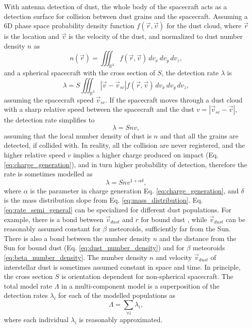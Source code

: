 With antenna detection of dust, the whole body of the spacecraft acts as a detection surface for collision between dust grains and the spacecraft. Assuming a 6D phase space probability density function $f(\vec{r},\vec{v})$ for the dust cloud, where $\vec{r}$ is the location and $\vec{v}$ is the velocity of the dust, and normalized to dust number density $n$ as
\begin{equation}
    n(\vec{r}) = \iiint_{\mathbb{R}^3} f(\vec{r},\vec{v}) \,dv_x\,dv_y\,dv_z,
\end{equation}
and a spherical spacecraft with the cross section of $S$, the detection rate $\lambda$ is
\begin{equation}
    \lambda = S \iiint_{\mathbb{R}^3} |\vec{v}-\vec{v}_{sc}| f(\vec{r},\vec{v})  \,dv_x\,dv_y\,dv_z, \label{eq:phase_space_lambda}
\end{equation}
assuming the spacecraft speed $\vec{v}_{sc}$. If the spacecraft moves through a dust cloud with a sharp relative speed between the spacecraft and the dust $v=|\vec{v}_{sc}-\vec{v}|$, the detection rate simplifies to  
\begin{equation}
    \lambda = S n v,
\end{equation}
assuming that the local number density of dust is $n$ and that all the grains are detected, if collided with. In reality, all the collision are never registered, and the higher relative speed $v$ implies a higher charge produced on impact (Eq. \ref{eq:charge_generation}), and in turn higher probability of detection, therefore the rate is sometimes modelled as
\begin{equation}
    \lambda = S n v^{1+\alpha \delta}, \label{eq:rate_semi_general}
\end{equation}
where $\alpha$ is the parameter in charge generation Eq. \ref{eq:charge_generation}, and $\delta$ is the mass distribution slope from Eq. \ref{eq:mass_distribution}. Eq. \ref{eq:rate_semi_general} can be specialized for different dust populations. For example, there is a bond between $\vec{v}_{dust}$ and $r$ for bound dust \citep{szalay2020near}, while $\vec{v}_{dust}$ can be reasonably assumed constant \citep{zaslavsky2021first} for $\beta$ meteoroids, sufficiently far from the Sun. There is also a bond between the number density $n$ and the distance from the Sun for bound dust (Eq. \ref{eq:dust_number_density}) and for $\beta$ meteoroids \ref{eq:beta_number_density}. The number density $n$ and velocity $\vec{v}_{dust}$ of interstellar dust is sometimes assumed constant in space and time. In principle, the cross section $S$ is orientation dependent for non-spherical spacecraft. The total model rate $\Lambda$ in a multi-component model is a superposition of the detection rates $\lambda_i$ for each of the modelled populations as
\begin{equation}
    \Lambda = \sum_{\forall i} \lambda_i,
\end{equation}
where each individual $\lambda_i$ is reasonably approximated. 

